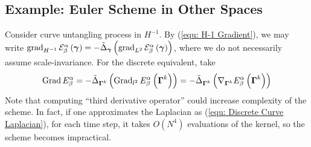 \documentclass[../dissertation.tex]{subfiles}
\begin{document}
\subsection{Example: Euler Scheme in Other Spaces}
\label{sct: Example: Euler Scheme in Other Spaces}
Consider curve untangling process in $H^{-1}$.
By (\ref{equ: H-1 Gradient}), we may write $\operatorname{grad}_{H^{-1}} \mathcal{E}_{\beta}^{\alpha} \left( \boldsymbol{\gamma} \right) = - \tilde{\Delta}_{\boldsymbol{\gamma}} \left( \operatorname{grad}_{L^2} \mathcal{E}_{\beta}^{\alpha} \left( \boldsymbol{\gamma} \right)\right)$,
where we do not necessarily assume scale-invariance.
For the discrete equivalent, take
\begin{equation}
    \operatorname{Grad} E_{\beta}^{\alpha} = - \tilde{\Delta}_{\boldsymbol{\Gamma}^k} \left( \operatorname{Grad}_{l^2} E_{\beta}^{\alpha} \left( \boldsymbol{\Gamma}^k \right) \right) = - \tilde{\Delta}_{\boldsymbol{\Gamma}^k} \left( \nabla_{\boldsymbol{\Gamma}^k} E_{\beta}^{\alpha} \left( \boldsymbol{\Gamma}^k \right) \right)
\end{equation}
Note that computing ``third derivative operator'' %
could increase complexity of the scheme.
In fact, if one approximates the Laplacian as (\ref{equ: Discrete Curve Laplacian}), 
for each time step, it takes $O \left( N^4 \right)$ evaluations of the kernel, so the scheme becomes impractical.
\end{document}
